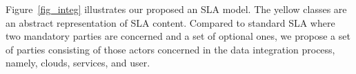 \documentclass[10pt, conference, compsocconf]{IEEEtran}
\begin{document}
%




Figure~\ref{fig_integ} illustrates our proposed an SLA model.
The yellow classes are an abstract representation of SLA content. %
Compared to standard SLA where two mandatory parties are concerned and a set of optional ones, we propose a set of parties consisting of  those  actors  concerned in the data integration process, namely, clouds, services, and user.
\end{document}
